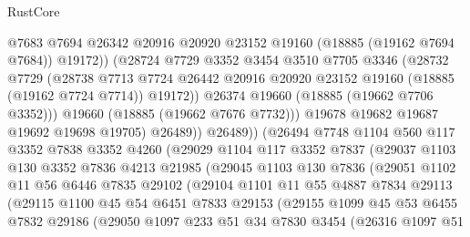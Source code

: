 \begin{lexlean}{RustCore}
\begin{coremodule}
                      @7683
                      @7694
                      @26342
                      @20916
                      @20920
                      @23152
                      @19160
                      (@18885 (@19162 @7694 @7684))
                      @19172))
                  (@28724
                    @7729
                    @3352
                    @3454
                    @3510
                    @7705
                    @3346
                    (@28732
                      @7729
                      (@28738
                        @7713
                        @7724
                        @26442
                        @20916
                        @20920
                        @23152
                        @19160
                        (@18885 (@19162 @7724 @7714))
                        @19172))
                    @26374
                    @19660
                    (@18885 (@19662 @7706 @3352)))
                  @19660
                  (@18885 (@19662 @7676 @7732)))
                @19678
                @19682
                @19687
                @19692
                @19698
                @19705)
              @26489))
          @26489))
      (@26494
        @7748
        @1104
        @560
        @117
        @3352
        @7838
        @3352
        @4260
        (@29029
          @1104
          @117
          @3352
          @7837
          (@29037
            @1103
            @130
            @3352
            @7836
            @4213
            @21985
            (@29045
              @1103
              @130
              @7836
              (@29051
                @1102
                @11
                @56
                @6446
                @7835
                @29102
                (@29104
                  @1101
                  @11
                  @55
                  @4887
                  @7834
                  @29113
                  (@29115
                    @1100
                    @45
                    @54
                    @6451
                    @7833
                    @29153
                    (@29155
                      @1099
                      @45
                      @53
                      @6455
                      @7832
                      @29186
                      (@29050
                        @1097
                        @233
                        @51
                        @34
                        @7830
                        @3454
                        (@26316
                          @1097
                          @51

\end{coremodule}
\end{lexlean}
